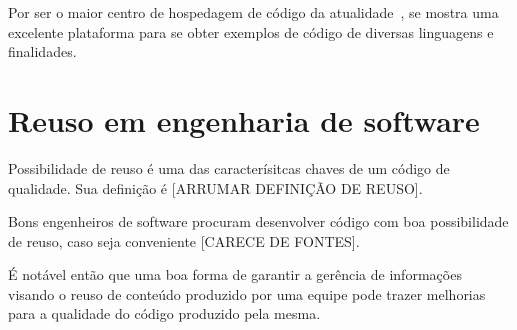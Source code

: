 Por ser o maior centro de hospedagem de código da atualidade~\cite{Gousios2012}, se mostra uma excelente plataforma para se obter exemplos de código de diversas linguagens e finalidades.

\section{Reuso em engenharia de software}

Possibilidade de reuso é uma das caracterísitcas chaves de um código de qualidade. Sua definição é [ARRUMAR DEFINIÇÃO DE REUSO].

Bons engenheiros de software procuram desenvolver código com boa possibilidade de reuso, caso seja conveniente [CARECE DE FONTES].

É notável então que uma boa forma de garantir a gerência de informações visando o reuso de conteúdo produzido por uma equipe pode trazer melhorias para a qualidade do código produzido pela mesma.
